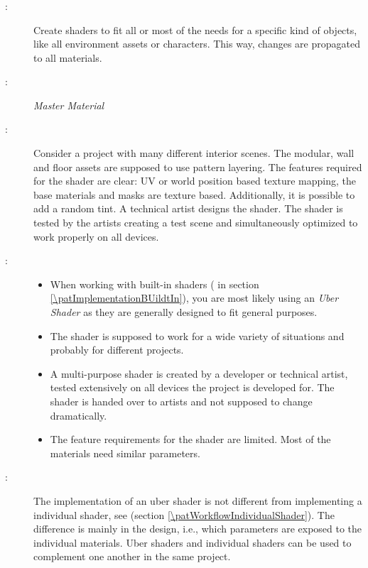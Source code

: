 \subsubsection{\patWorkflowUberShader}\label{\patWorkflowUberShader}
\begin{description}
	\item[\patIntent:]%
	Create shaders to fit all or most of the needs for a specific kind of objects, like all environment assets or characters. This way, changes are propagated to all materials.
	\item[\patAlsoKnownAs:]%
	\emph{Master Material}	
	\item[\patMotivation:]%
	Consider a project with many different interior scenes. The modular, wall and floor assets are supposed to use pattern layering. The features required for the shader are clear: UV or world position based texture mapping, the base materials and masks are texture based. Additionally, it is possible to add a random tint. A technical artist designs the shader. The shader is tested by the artists creating a test scene and simultaneously optimized to work properly on all devices.
	\item[\patApplicability:]\hfill
	\begin{itemize}\mynobreakpar
		\item When working with built-in shaders (\emph{\patImplementationBUildtIn} in section \ref{\patImplementationBUildtIn}), you are most likely using an \emph{Uber Shader} as they are generally designed to fit general purposes.
		\item The shader is supposed to work for a wide variety of situations and probably for different projects. 
		\item A multi-purpose shader is created by a developer or technical artist, tested extensively on all devices the project is developed for. The shader is handed over to artists and not supposed to change dramatically.
		\item The feature requirements for the shader are limited. Most of the materials need similar parameters.  
	\end{itemize}
	\item[\patImplementation:]%
	The implementation of an uber shader is not different from implementing a individual shader, see \emph{\patWorkflowIndividualShader} (section \ref{\patWorkflowIndividualShader}). The difference is mainly in the design, i.e., which parameters are exposed to the individual materials. Uber shaders and individual shaders can be used to complement one another in the same project.

\end{description}
